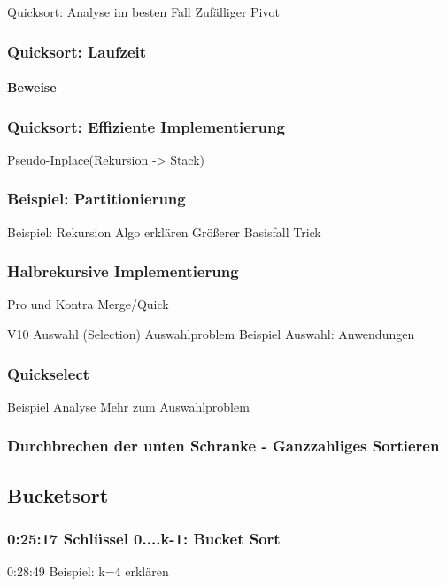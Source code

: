 \documentclass[a4paper]{scrartcl}
\begin{document}
	    Quicksort: Analyse im besten Fall 
	    Zufälliger Pivot 
	    
			\subsubsection{Quicksort: Laufzeit }
			\paragraph{Beweise }
		
			\subsubsection{ Quicksort: Effiziente Implementierung}
			 Pseudo-Inplace(Rekursion -> Stack)
			
			\subsubsection{Beispiel: Partitionierung} 
			Beispiel: Rekursion 
			Algo erklären
			Größerer Basisfall 
			Trick
		
			\subsubsection{Halbrekursive Implementierung }
			Pro und Kontra Merge/Quick
			
			V10	 Auswahl (Selection) 
			Auswahlproblem
			Beispiel 
			Auswahl: Anwendungen 
			\subsubsection{Quickselect}
			Beispiel 
			Analyse 
			Mehr zum Auswahlproblem 
			
			\subsubsection{Durchbrechen der unten Schranke - Ganzzahliges Sortieren }
			
		\subsection{Bucketsort}
		
			\subsubsection{0:25:17 Schlüssel 0....k-1: Bucket Sort }
			0:28:49 Beispiel: k=4 
			erklären
			
\end{document}
